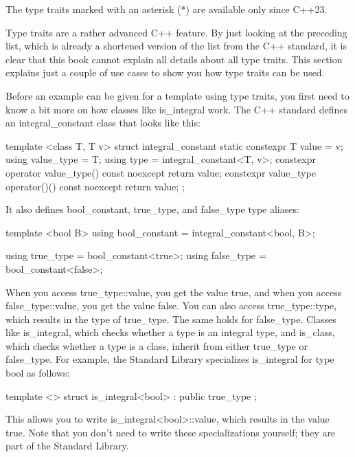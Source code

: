 The type traits marked with an asterisk (*) are available only since C++23.

Type traits are a rather advanced C++ feature. By just looking at the preceding list, which is already a shortened version of the list from the C++ standard, it is clear that this book cannot explain all details about all type traits. This section explains just a couple of use cases to show you how type traits can be used.


Before an example can be given for a template using type traits, you first need to know a bit more on how classes like is\_integral work. The C++ standard defines an integral\_constant class that looks like this:

\begin{cpp}
template <class T, T v>
struct integral_constant {
    static constexpr T value = v;
    using value_type = T;
    using type = integral_constant<T, v>;
    constexpr operator value_type() const noexcept { return value; }
    constexpr value_type operator()() const noexcept { return value; }
};
\end{cpp}

It also defines bool\_constant, true\_type, and false\_type type aliases:

\begin{cpp}
template <bool B>
using bool_constant = integral_constant<bool, B>;

using true_type = bool_constant<true>;
using false_type = bool_constant<false>;
\end{cpp}

When you access true\_type::value, you get the value true, and when you access false\_type::value, you get the value false. You can also access true\_type::type, which results in the type of true\_type. The same holds for false\_type. Classes like is\_integral, which checks whether a type is an integral type, and is\_class, which checks whether a type is a class, inherit from either true\_type or false\_type. For example, the Standard Library specializes is\_integral for type bool as follows:

\begin{cpp}
template <> struct is_integral<bool> : public true_type { };
\end{cpp}

This allows you to write is\_integral<bool>::value, which results in the value true. Note that you don’t need to write these specializations yourself; they are part of the Standard Library.

